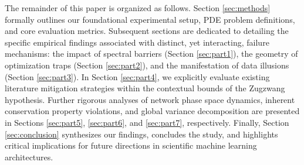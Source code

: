 The remainder of this paper is organized as follows. Section \ref{sec:methods} formally outlines our foundational experimental setup, PDE problem definitions, and core evaluation metrics. Subsequent sections are dedicated to detailing the specific empirical findings associated with distinct, yet interacting, failure mechanisms: the impact of spectral barriers (Section \ref{sec:part1}), the geometry of optimization traps (Section \ref{sec:part2}), and the manifestation of data illusions (Section \ref{sec:part3}). In Section \ref{sec:part4}, we explicitly evaluate existing literature mitigation strategies within the contextual bounds of the Zugzwang hypothesis. Further rigorous analyses of network phase space dynamics, inherent conservation property violations, and global variance decomposition are presented in Sections \ref{sec:part5}, \ref{sec:part6}, and \ref{sec:part7}, respectively. Finally, Section \ref{sec:conclusion} synthesizes our findings, concludes the study, and highlights critical implications for future directions in scientific machine learning architectures.
